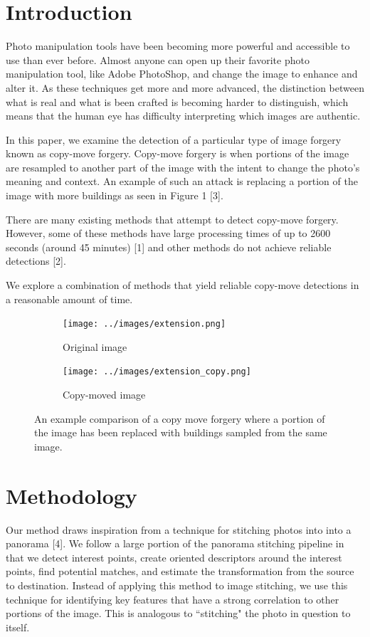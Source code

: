 \documentclass[12pt]{article}
\begin{document}
\section*{Introduction}
Photo manipulation tools have been becoming more powerful and accessible to use than ever before. Almost anyone can open up their favorite photo manipulation tool, like Adobe PhotoShop, and change the image to enhance and alter it. As these techniques get more and more advanced, the distinction between what is real and what is been crafted is becoming harder to distinguish, which means that the human eye has difficulty interpreting which images are authentic.

In this paper, we examine the detection of a particular type of image forgery known as copy-move forgery. Copy-move forgery is when portions of the image are resampled to another part of the image with the intent to change the photo's meaning and context. An example of such an attack is replacing a portion of the image with more buildings as seen in Figure 1 [3].

There are many existing methods that attempt to detect copy-move forgery. However, some of these methods have large processing times of up to 2600 seconds (around 45 minutes) [1] and other methods do not achieve reliable detections [2].

We explore a combination of methods that yield reliable copy-move detections in a reasonable amount of time.


\begin{figure}
\centering
\begin{subfigure}{.5\textwidth}
  \centering
  \texttt{[image: ../images/extension.png]}
  \caption{Original image}
  \label{fig:sub1}
\end{subfigure}%
\begin{subfigure}{.5\textwidth}
  \centering
  \texttt{[image: ../images/extension\_copy.png]}
  \caption{Copy-moved image}
  \label{fig:sub2}
\end{subfigure}
\caption{An example comparison of a copy move forgery where a portion of the image has been replaced with buildings sampled from the same image.}
\label{fig:test}
\end{figure}


\section*{Methodology}
Our method draws inspiration from a technique for stitching photos into into a panorama [4]. We follow a large portion of the panorama stitching pipeline in that we detect interest points, create oriented descriptors around the interest points, find potential matches, and estimate the transformation from the source to destination. Instead of applying this method to image stitching, we use this technique for identifying key features that have a strong correlation to other portions of the image. This is analogous to ``stitching" the photo in question to itself.
\end{document}
